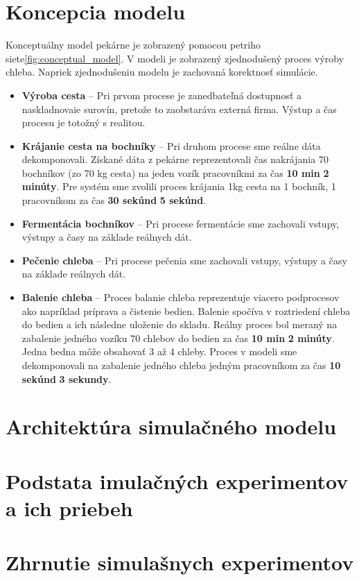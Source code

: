 \documentclass[a4paper, 10pt]{article}
\begin{document}
    \section {Koncepcia modelu}
    Konceptuálny model pekárne je zobrazený pomocou petriho siete\ref{fig:conceptual_model}.
    V modeli je zobrazený zjednodušený proces výroby chleba. Napriek zjednodušeniu modelu je zachovaná korektnosť simulácie.
    \begin{itemize}
        \item \textbf{Výroba cesta} -- Pri prvom procese je zanedbateľná dostupnosť a naskladnovaie surovín,
        pretože to zaobstaráva externá firma. Výstup a čas procesu je totožný s realitou.

        \item \textbf{Krájanie cesta na bochníky} -- Pri druhom procese sme reálne dáta dekomponovali. Získané
        dáta z pekárne reprezentovali čas nakrájania 70 bochníkov (zo 70 kg cesta) na jeden vozík pracovníkmi za čas \textbf{10 min} \textpm \textbf{ 2 minúty}.
        Pre systém sme zvolili proces krájania 1kg cesta na 1 bochník, 1 pracovníkom za čas \textbf{30 sekúnd} \textpm \textbf{ 5 sekúnd}.

        \item \textbf{Fermentácia bochníkov} -- Pri procese fermentácie sme zachovali vstupy, výstupy a časy na základe reálnych dát.

        \item \textbf{Pečenie chleba} -- Pri procese pečenia sme zachovali vstupy, výstupy a časy na základe reálnych dát.

        \item \textbf{Balenie chleba} -- Proces balanie chleba reprezentuje viacero podprocesov ako napríklad príprava a čistenie bedien.
        Balenie spočíva v roztriedení chleba do bedien a ich následne uloženie do skladu. Reálny proces bol meraný na
        zabalenie jedného vozíku 70 chlebov do bedien za čas \textbf{10 min} \textpm \textbf{ 2 minúty}. Jedna bedna môže obsahovať 3 až 4 chleby. Proces v modeli sme dekomponovali
        na zabalenie jedného chleba jedným pracovníkom za čas \textbf{10 sekúnd} \textpm \textbf{ 3 sekundy}.
    \end{itemize}

    \section{Architektúra simulačného modelu}

    \section{Podstata imulačných experimentov a ich priebeh}

    \section{Zhrnutie simulašnych experimentov}


    \newpage
    
    
\end{document}
